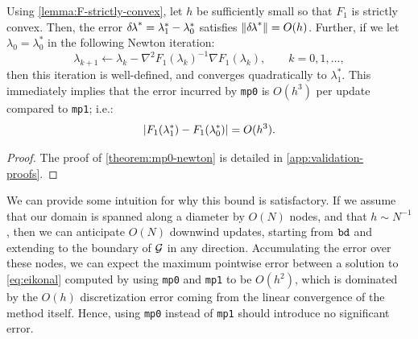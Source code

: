 \documentclass[sisc-eikonal.tex]{subfiles}
\begin{document}
\begin{theorem}\label{theorem:mp0-newton}
  Using \cref{lemma:F-strictly-convex}, let $h$ be sufficiently small
  so that $F_1$ is strictly convex. Then, the error
  ${\delta \hspace{-0.1em} \lambda}^* = \lambda_1^* - \lambda_0^*$ satisfies
  $\left\|{\delta \hspace{-0.1em} \lambda}^*\right\| = O(h)$. Further, if we let
  $\lambda_0 = \lambda_0^*$ in the following Newton iteration:
  \begin{equation}
    \label{eq:lam0-iter-to-lam1}
    \lambda_{k+1} \gets \lambda_k - \nabla^2 F_1(\lambda_k)^{-1} \nabla F_1(\lambda_k), \qquad k = 0, 1, \hdots,
  \end{equation}
  then this iteration is well-defined, and converges quadratically to
  $\lambda_1^*$. This immediately implies that the error incurred by
  \texttt{mp0} is $O(h^3)$ per update compared to \texttt{mp1}; i.e.:
  \begin{equation}
    \label{eq:mp0-error}
    \abs{F_1(\lambda_1^*) - F_1(\lambda_0^*)} = O(h^3).
  \end{equation}
\end{theorem}

\begin{proof}
  The proof of \cref{theorem:mp0-newton} is detailed in
  \cref{app:validation-proofs}.
\end{proof}

We can provide some intuition for why this bound is satisfactory. If
we assume that our domain is spanned along a diameter by $O(N)$ nodes,
and that $h \sim N^{-1}$, then we can anticipate $O(N)$ downwind
updates, starting from $\texttt{bd}$ and extending to the boundary of
$\mathcal{G}$ in any direction. Accumulating the error over these nodes, we
can expect the maximum pointwise error between a solution to
\cref{eq:eikonal} computed by using \texttt{mp0} and \texttt{mp1} to
be $O(h^2)$, which is dominated by the $O(h)$ discretization error
coming from the linear convergence of the method itself. Hence, using
\texttt{mp0} instead of \texttt{mp1} should introduce no significant
error.

\end{document}
